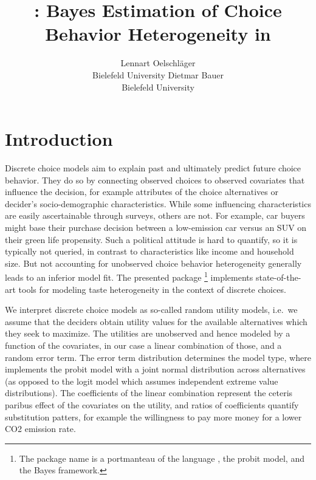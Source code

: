 \documentclass[article,shortnames]{jss}
\author{Lennart Oelschl\"ager \\Bielefeld University \And Dietmar Bauer\\Bielefeld University}
\title{\pkg{RprobitB}: Bayes Estimation of Choice Behavior Heterogeneity in \proglang{R}}
\newcommand{\fct}[1]{\code{#1()}}
\begin{document}



\section{Introduction}
\label{sec:introduction}

Discrete choice models aim to explain past and ultimately predict future choice behavior. They do so by connecting observed choices to observed covariates that influence the decision, for example attributes of the choice alternatives or decider's socio-demographic characteristics. While some influencing characteristics are easily ascertainable through surveys, others are not. For example, car buyers might base their purchase decision between a low-emission car versus an SUV on their green life propensity. Such a political attitude is hard to quantify, so it is typically not queried, in contrast to characteristics like income and household size. But not accounting for unobserved choice behavior heterogeneity generally leads to an inferior model fit. The presented  package \footnote{The package name is a portmanteau of the language , the probit model, and the Bayes framework.} \citep{Oelschlaeger:2021} implements state-of-the-art tools for modeling taste heterogeneity in the context of discrete choices.

We interpret discrete choice models as so-called random utility models, i.e.\ we assume that the deciders obtain utility values for the available alternatives which they seek to maximize. The utilities are unobserved and hence modeled by a function of the covariates, in our case a linear combination of those, and a random error term. The error term distribution determines the model type, where  implements the probit model with a joint normal distribution across alternatives (as opposed to the logit model which assumes independent extreme value distributions). The coefficients of the linear combination represent the ceteris paribus effect of the covariates on the utility, and ratios of coefficients quantify substitution patters, for example the willingness to pay more money for a lower CO2 emission rate.
\end{document}
